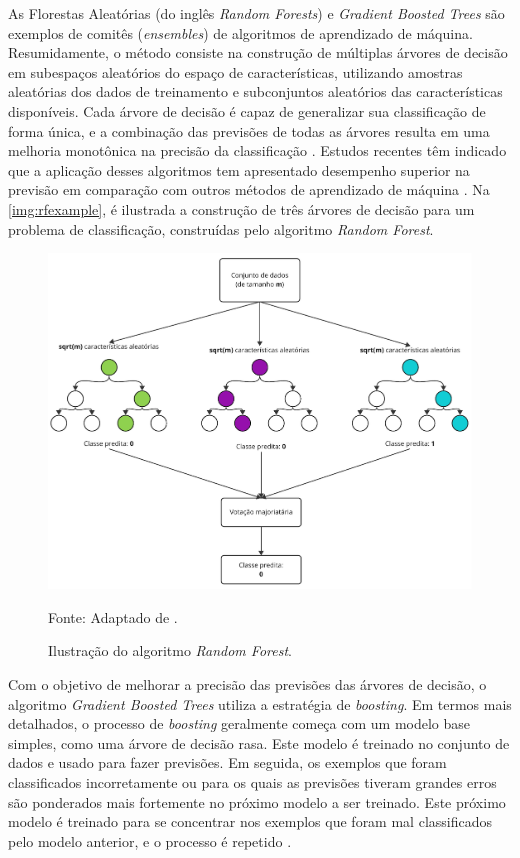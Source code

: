 As Florestas Aleatórias (do inglês \textit{Random Forests}) e \textit{Gradient Boosted Trees} são exemplos de comitês (\textit{ensembles}) de algoritmos de aprendizado de máquina. Resumidamente, o método consiste na construção de múltiplas árvores de decisão em subespaços aleatórios do espaço de características, utilizando amostras aleatórias dos dados de treinamento e subconjuntos aleatórios das características disponíveis. Cada árvore de decisão é capaz de generalizar sua classificação de forma única, e a combinação das previsões de todas as árvores resulta em uma melhoria monotônica na precisão da classificação \cite{RandomForests}. Estudos recentes têm indicado que a aplicação desses algoritmos tem apresentado desempenho superior na previsão em comparação com outros métodos de aprendizado de máquina \cite{geron2022hands, Raschka}. Na \autoref{img:rfexample}, é ilustrada a construção de três árvores de decisão para um problema de classificação, construídas pelo algoritmo \textit{Random Forest}.

\begin{figure}
	\centering
	\caption{\label{img:rfexample}Ilustração do algoritmo \textit{Random Forest}.}
	\includegraphics[scale=0.7]{USPSC-img/random_forest_example.pdf}
	\begin{center}
		Fonte: Adaptado de .
	\end{center}
\end{figure}

Com o objetivo de melhorar a precisão das previsões das árvores de decisão, o algoritmo \textit{Gradient Boosted Trees} \cite{friedman2000} utiliza a estratégia de \textit{boosting}. Em termos mais detalhados, o processo de \textit{boosting} geralmente começa com um modelo base simples, como uma árvore de decisão rasa. Este modelo é treinado no conjunto de dados e usado para fazer previsões. Em seguida, os exemplos que foram classificados incorretamente ou para os quais as previsões tiveram grandes erros são ponderados mais fortemente no próximo modelo a ser treinado. Este próximo modelo é treinado para se concentrar nos exemplos que foram mal classificados pelo modelo anterior, e o processo é repetido \cite{friedman2000}.

